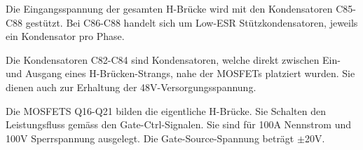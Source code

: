 Die Eingangsspannung der gesamten H-Brücke wird mit den Kondensatoren C85-C88 gestützt.
Bei C86-C88 handelt sich um Low-ESR Stützkondensatoren, jeweils ein Kondensator pro Phase.

Die Kondensatoren C82-C84 sind Kondensatoren, welche direkt zwischen Ein- und Ausgang eines H-Brücken-Strangs, nahe der MOSFETs platziert wurden.
Sie dienen auch zur Erhaltung der 48V-Versorgungsspannung.

Die MOSFETS Q16-Q21 bilden die eigentliche H-Brücke. Sie Schalten den Leistungsfluss gemäss den Gate-Ctrl-Signalen. Sie sind für 100A Nennstrom und 100V Sperrspannung ausgelegt. Die Gate-Source-Spannung beträgt $\pm$20V.